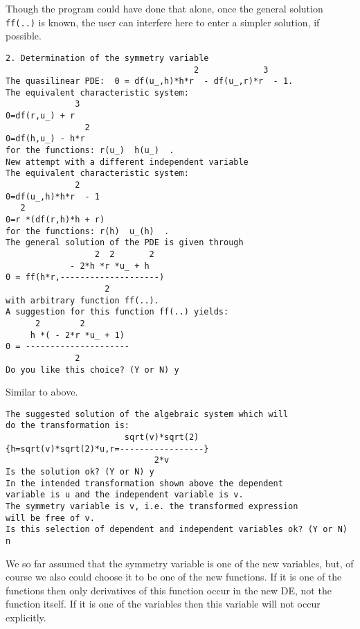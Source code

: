 Though the program could have done that alone, once the general solution
\texttt{ff(..)} is known, the user can interfere here to enter a simpler solution,
if possible.
{\small \begin{verbatim}
2. Determination of the symmetry variable
                                      2             3
The quasilinear PDE:  0 = df(u_,h)*h*r  - df(u_,r)*r  - 1.
The equivalent characteristic system:
              3
0=df(r,u_) + r
                2
0=df(h,u_) - h*r
for the functions: r(u_)  h(u_)  .
New attempt with a different independent variable
The equivalent characteristic system:
              2
0=df(u_,h)*h*r  - 1
   2
0=r *(df(r,h)*h + r)
for the functions: r(h)  u_(h)  .
The general solution of the PDE is given through
                  2  2       2
             - 2*h *r *u_ + h
0 = ff(h*r,--------------------)
                    2
with arbitrary function ff(..).
A suggestion for this function ff(..) yields:
      2        2
     h *( - 2*r *u_ + 1)
0 = ---------------------
              2
Do you like this choice? (Y or N) y
\end{verbatim}}
Similar to above.
{\small \begin{verbatim}
The suggested solution of the algebraic system which will
do the transformation is:
                        sqrt(v)*sqrt(2)
{h=sqrt(v)*sqrt(2)*u,r=-----------------}
                              2*v
Is the solution ok? (Y or N) y
In the intended transformation shown above the dependent
variable is u and the independent variable is v.
The symmetry variable is v, i.e. the transformed expression
will be free of v.
Is this selection of dependent and independent variables ok? (Y or N) n
\end{verbatim}}
We so far assumed that the symmetry variable is one of the new variables, but,
of course we also could choose it to be one of the new functions.
If it is one of the functions then only derivatives of this function occur
in the new DE, not the function itself. If it is one of the variables then
this variable will not occur explicitly.

